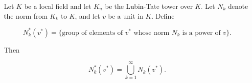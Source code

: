 Let $K$ be a local field and let $K_n$ be the Lubin-Tate tower over $K$. Let $N_k$ denote the norm from $K_k$ to $K$, and let $v$ be a unit in $K$. Define

$$N_k^*(v^*) = \{\text{group of elements of } v^* \text{ whose norm } N_k \text{ is a power of } v\}.$$

Then

$$N_k^*(v^*) = \bigcup_{k=1}^{\infty} N_k(v^*).$$
